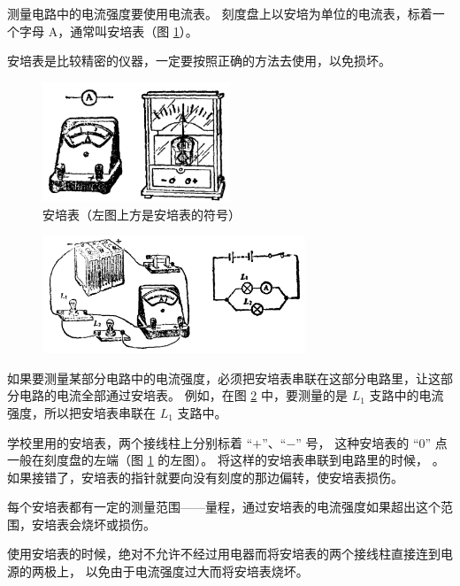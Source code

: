 测量电路中的电流强度要使用电流表。
刻度盘上以安培为单位的电流表，标着一个字母 A，通常叫安培表（图 \ref{fig:8-1}）。

安培表是比较精密的仪器，一定要按照正确的方法去使用，以免损坏。

\begin{figure}[htbp]
    \centering
    \includegraphics[width=0.5\textwidth]{../pic/czwl2-ch8-1}
    \caption{安培表（左图上方是安培表的符号）}\label{fig:8-1}
\end{figure}

\begin{figure}[htbp]
    \centering
    \includegraphics[width=0.7\textwidth]{../pic/czwl2-ch8-2}
    \caption{}\label{fig:8-2}
\end{figure}


如果要测量某部分电路中的电流强度，必须把安培表串联在这部分电路里，让这部分电路的电流全部通过安培表。
例如，在图 \ref{fig:8-2} 中，要测量的是 $L_1$ 支路中的电流强度，所以把安培表串联在 $L_1$ 支路中。

学校里用的安培表，两个接线柱上分别标着 “$+$”、“$-$” 号，
这种安培表的 “0” 点一般在刻度盘的左端（图 \ref{fig:8-1} 的左图）。
将这样的安培表串联到电路里的时候，
。
如果接错了，安培表的指针就要向没有刻度的那边偏转，使安培表损伤。

每个安培表都有一定的测量范围——量程，通过安培表的电流强度如果超出这个范围，安培表会烧坏或损伤。

使用安培表的时候，绝对不允许不经过用电器而将安培表的两个接线柱直接连到电源的两极上，
以免由于电流强度过大而将安培表烧坏。

